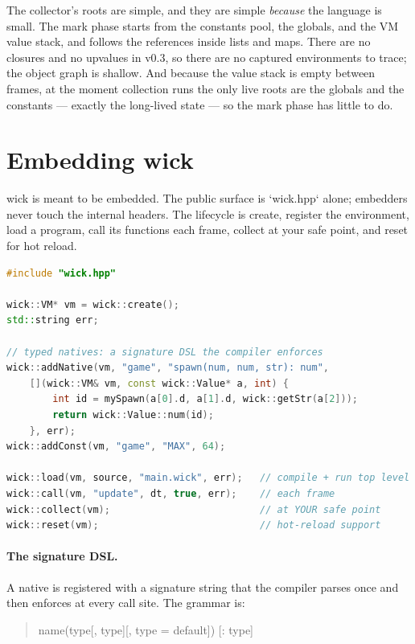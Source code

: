 The collector's roots are simple, and they are simple \emph{because} the
language is small. The mark phase starts from the constants pool, the globals,
and the VM value stack, and follows the references inside lists and maps.
There are no closures and no upvalues in v0.3, so there are no captured
environments to trace; the object graph is shallow. And because the value
stack is empty between frames, at the moment collection runs the only live
roots are the globals and the constants --- exactly the long-lived state --- so
the mark phase has little to do.

\section{Embedding wick}

wick is meant to be embedded. The public surface is `wick.hpp` alone; embedders
never touch the internal headers. The lifecycle is create, register the
environment, load a program, call its functions each frame, collect at your
safe point, and reset for hot reload.

\begin{lstlisting}[language=C++,basicstyle=\ttfamily\small,keywordstyle=\color{wkKeyword}]
#include "wick.hpp"

wick::VM* vm = wick::create();
std::string err;

// typed natives: a signature DSL the compiler enforces
wick::addNative(vm, "game", "spawn(num, num, str): num",
    [](wick::VM& vm, const wick::Value* a, int) {
        int id = mySpawn(a[0].d, a[1].d, wick::getStr(a[2]));
        return wick::Value::num(id);
    }, err);
wick::addConst(vm, "game", "MAX", 64);

wick::load(vm, source, "main.wick", err);   // compile + run top level
wick::call(vm, "update", dt, true, err);    // each frame
wick::collect(vm);                          // at YOUR safe point
wick::reset(vm);                            // hot-reload support
\end{lstlisting}

\paragraph{The signature DSL.} A native is registered with a signature string
that the compiler parses once and then enforces at every call site. The
grammar is:

\begin{quote}
\ttfamily name(type[, type][, type = default]) [: type]
\end{quote}

